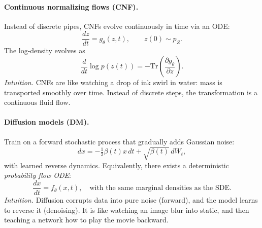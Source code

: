 \documentclass[11pt]{article}
\theoremstyle{remark}
\begin{document}
\paragraph{Continuous normalizing flows (CNF).}
Instead of discrete pipes, CNFs evolve continuously in time via an ODE:
\begin{equation}
\frac{dz}{dt} = g_\theta(z,t), \qquad z(0)\sim p_Z.
\label{eq:cnf-ode}
\end{equation}
The log-density evolves as
\begin{equation}
\frac{d}{dt}\log p(z(t)) = - \mathrm{Tr}\!\left(\frac{\partial g_\theta}{\partial z}\right).
\label{eq:cnf-log}
\end{equation}
\textit{Intuition.} CNFs are like watching a drop of ink swirl in water: mass is transported smoothly over time. Instead of discrete steps, the transformation is a continuous fluid flow.

\paragraph{Diffusion models (DM).}
Train on a forward stochastic process that gradually adds Gaussian noise:
\begin{equation}
dx = -\tfrac{1}{2}\beta(t) x \, dt + \sqrt{\beta(t)}\, dW_t,
\label{eq:forward-sde}
\end{equation}
with learned reverse dynamics. Equivalently, there exists a deterministic \emph{probability flow ODE}:
\begin{equation}
\frac{dx}{dt} = f_\theta(x,t), \quad \text{with the same marginal densities as the SDE.}
\label{eq:dm-ode}
\end{equation}
\textit{Intuition.} Diffusion corrupts data into pure noise (forward), and the model learns to reverse it (denoising). It is like watching an image blur into static, and then teaching a network how to play the movie backward.
\end{document}
